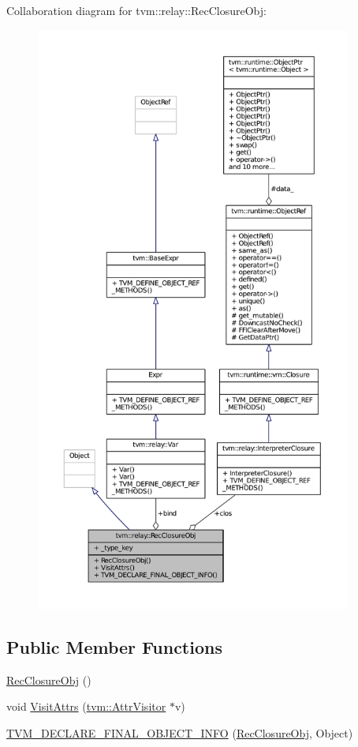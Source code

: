 Collaboration diagram for tvm\+:\+:relay\+:\+:Rec\+Closure\+Obj\+:
\nopagebreak
\begin{figure}[H]
\begin{center}
\leavevmode
\includegraphics[height=550pt]{classtvm_1_1relay_1_1RecClosureObj__coll__graph}
\end{center}
\end{figure}
\subsection*{Public Member Functions}
\begin{DoxyCompactItemize}
\item 
\hyperlink{classtvm_1_1relay_1_1RecClosureObj_a8dded0ea6f2775cd75b697e11497c29d}{Rec\+Closure\+Obj} ()
\item 
void \hyperlink{classtvm_1_1relay_1_1RecClosureObj_a352f57e3fda160d51855c046b877e244}{Visit\+Attrs} (\hyperlink{classtvm_1_1AttrVisitor}{tvm\+::\+Attr\+Visitor} $\ast$v)
\item 
\hyperlink{classtvm_1_1relay_1_1RecClosureObj_a72a5a3b08813ae5655ea77d9099429b4}{T\+V\+M\+\_\+\+D\+E\+C\+L\+A\+R\+E\+\_\+\+F\+I\+N\+A\+L\+\_\+\+O\+B\+J\+E\+C\+T\+\_\+\+I\+N\+FO} (\hyperlink{classtvm_1_1relay_1_1RecClosureObj}{Rec\+Closure\+Obj}, Object)
\end{DoxyCompactItemize}

